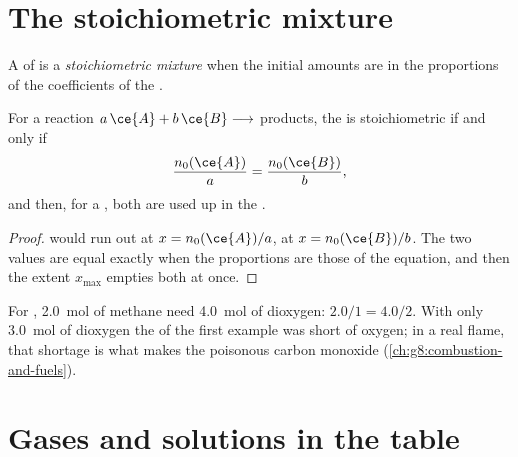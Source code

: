\section{The stoichiometric mixture}

\begin{definition}\label{def:g10:reaction-progress-table:stoichiometric}
A  of  is a \emph{stoichiometric
mixture} when the initial amounts are in
the proportions of the coefficients of the .
\end{definition}

\begin{proposition}\label{prop:g10:reaction-progress-table:together}
For a reaction $a\,\ce{A} + b\,\ce{B} \longrightarrow$ products, the  is stoichiometric if
and only if
\[
  \frac{n_0(\ce{A})}{a} = \frac{n_0(\ce{B})}{b},
\]
and then, for a , both  are used up in the .
\end{proposition}

\begin{proof}
 would run out at $x = n_0(\ce{A})/a$,  at $x = n_0(\ce{B})/b$.
The two values are equal exactly when the proportions are those of the
equation, and then the extent $x_{\max}$ empties both at once.
\end{proof}

\begin{example}\label{ex:g10:reaction-progress-table:stoich}
For , \qty{2.0}{mol} of methane need
\qty{4.0}{mol} of dioxygen: $2.0/1 = 4.0/2$. With only \qty{3.0}{mol}
of dioxygen the  of the first example was short of oxygen; in a
real flame, that shortage is what makes the poisonous carbon monoxide
(\cref{ch:g8:combustion-and-fuels}).
\end{example}

\section{Gases and solutions in the table}


